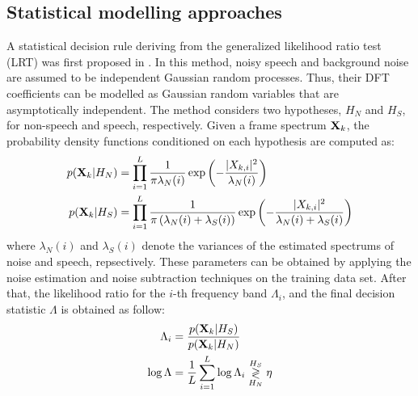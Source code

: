 \subsection{Statistical modelling approaches}
A statistical decision rule deriving from the generalized likelihood ratio test (LRT) was first proposed in \cite{sohn1998voice}. In this method, noisy speech and background noise are assumed to be independent Gaussian random processes. Thus, their DFT coefficients can be modelled as Gaussian random variables that are asymptotically independent. The method considers two hypotheses, $H_N$ and $H_S$, for non-speech and speech, respectively. Given a frame spectrum $\mathbf{X}_k$, the probability density functions conditioned on each hypothesis are computed as:
\begin{align}
	p(\mathbf{X}_k|H_N) &= \prod_{i=1}^L \frac{1}{\pi\lambda_N(i)} \exp \left(-\frac{|X_{k,i}|^2}{\lambda_N(i)} \right) \\	
	p(\mathbf{X}_k|H_S) &= \prod_{i=1}^L \frac{1}{\pi\left(\lambda_N(i)+\lambda_S(i)\right)} \exp \left(-\frac{|X_{k,i}|^2}{\lambda_N(i)+\lambda_S(i)} \right)
\end{align}
where $\lambda_N(i)$ and $\lambda_S(i)$ denote the variances of the estimated spectrums of noise and speech, repsectively. These parameters can be obtained by applying the noise estimation and noise subtraction techniques on the training data set. After that, the likelihood ratio for the $i$-th frequency band $\Lambda_i$, and the final decision statistic $\Lambda$ is obtained as follow:
\begin{align}
	\Lambda_i &= \frac{p(\mathbf{X}_k|H_S)}{p(\mathbf{X}_k|H_N)} \\
	\log \Lambda &= \frac{1}{L} \sum_{i=1}^L \log \Lambda_i \overset{H_S}{\underset{H_N}{\gtrless}} \eta \label{eq:LRT}
\end{align}

